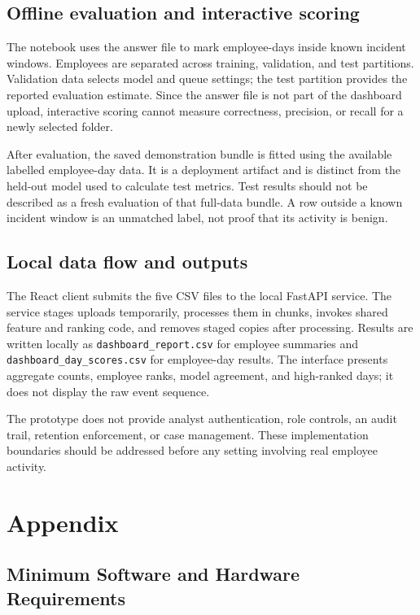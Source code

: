 \documentclass[12pt,a4paper,oneside]{report}
\begin{document}
\section{Offline evaluation and interactive scoring}
The notebook uses the answer file to mark employee-days inside known
incident windows. Employees are separated across training, validation,
and test partitions. Validation data selects model and queue settings;
the test partition provides the reported evaluation estimate. Since
the answer file is not part of the dashboard upload, interactive
scoring cannot measure correctness, precision, or recall for a newly
selected folder.

After evaluation, the saved demonstration bundle is fitted using the
available labelled employee-day data. It is a deployment artifact and
is distinct from the held-out model used to calculate test metrics.
Test results should not be described as a fresh evaluation of that
full-data bundle. A row outside a known incident window is an unmatched
label, not proof that its activity is benign.

\section{Local data flow and outputs}
The React client submits the five CSV files to the local FastAPI
service. The service stages uploads temporarily, processes them in
chunks, invokes shared feature and ranking code, and removes staged
copies after processing. Results are written locally as
\texttt{dashboard\_report.csv} for employee summaries and
\texttt{dashboard\_day\_scores.csv} for employee-day results. The
interface presents aggregate counts, employee ranks, model agreement,
and high-ranked days; it does not display the raw event sequence.

The prototype does not provide analyst authentication, role controls,
an audit trail, retention enforcement, or case management. These
implementation boundaries should be addressed before any setting
involving real employee activity.

\chapter{Appendix}
\label{chap:appendix}
\section{Minimum Software and Hardware Requirements}
\end{document}
